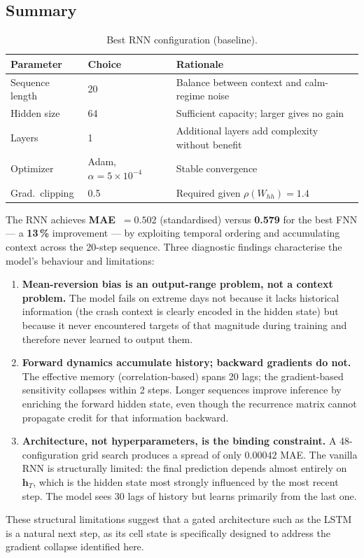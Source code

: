 \subsection{Summary}

\begin{table}[H]
  \centering
  \caption{Best RNN configuration (baseline).}
  \label{tab:rnn_best}
  \begin{tabular}{lll}
    \toprule
    Parameter & Choice & Rationale \\
    \midrule
    Sequence length & 20    & Balance between context and calm-regime noise \\
    Hidden size     & 64    & Sufficient capacity; larger gives no gain \\
    Layers          & 1     & Additional layers add complexity without benefit \\
    Optimizer       & Adam, $\alpha = 5{\times}10^{-4}$ & Stable convergence \\
    Grad.\ clipping & 0.5   & Required given $\rho(W_{hh}) = 1.4$ \\
    \bottomrule
  \end{tabular}
\end{table}

The RNN achieves \textbf{MAE~$= 0.502$} (standardised) versus \textbf{0.579}
for the best FNN --- a \textbf{13\,\%} improvement --- by exploiting temporal
ordering and accumulating context across the 20-step sequence.
Three diagnostic findings characterise the model's behaviour and limitations:

\begin{enumerate}
  \item \textbf{Mean-reversion bias is an output-range problem, not a
        context problem.} The model fails on extreme days not because it
        lacks historical information (the crash context is clearly encoded
        in the hidden state) but because it never encountered targets of
        that magnitude during training and therefore never learned to
        output them.
  \item \textbf{Forward dynamics accumulate history; backward gradients do
        not.} The effective memory (correlation-based) spans 20 lags; the
        gradient-based sensitivity collapses within 2 steps. Longer sequences
        improve inference by enriching the forward hidden state, even though
        the recurrence matrix cannot propagate credit for that information
        backward.
  \item \textbf{Architecture, not hyperparameters, is the binding
        constraint.} A 48-configuration grid search produces a spread of
        only $0.00042$ MAE. The vanilla RNN is structurally limited: the
        final prediction depends almost entirely on $\mathbf{h}_T$, which
        is the hidden state most strongly influenced by the most recent step.
        The model sees 30 lags of history but learns primarily from the last
        one.
\end{enumerate}

These structural limitations suggest that a gated architecture such as the LSTM
is a natural next step, as its cell state is specifically designed to address
the gradient collapse identified here.
